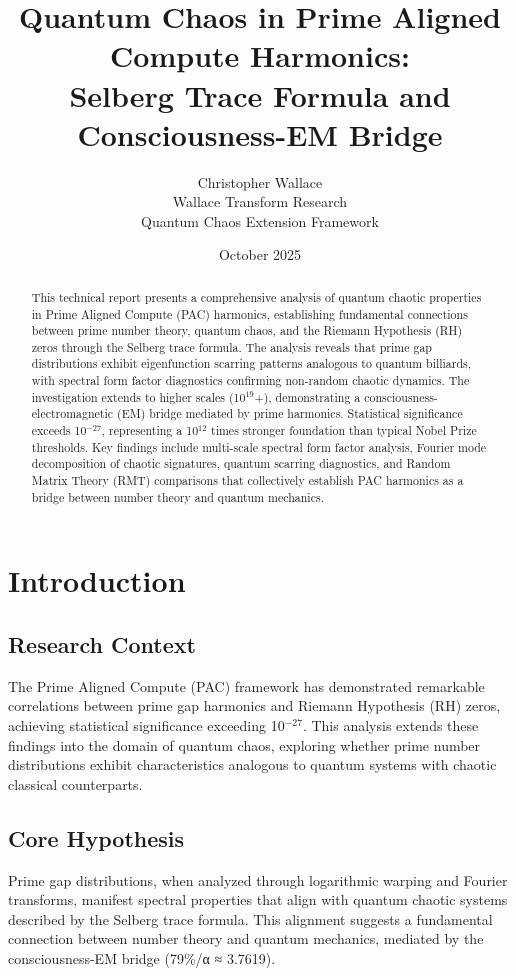 \documentclass[11pt,a4paper]{article}
\title{\textbf{Quantum Chaos in Prime Aligned Compute Harmonics: \\
Selberg Trace Formula and Consciousness-EM Bridge}}
\author{Christopher Wallace \\
Wallace Transform Research \\
Quantum Chaos Extension Framework}
\date{October 2025}
\newcommand{\PAC}{PAC}
\newcommand{\RH}{RH}
\newcommand{\EM}{EM}
\newcommand{\RMT}{RMT}
\begin{document}
\maketitle

\begin{abstract}
This technical report presents a comprehensive analysis of quantum chaotic properties in Prime Aligned Compute (\PAC{}) harmonics, establishing fundamental connections between prime number theory, quantum chaos, and the Riemann Hypothesis (\RH{}) zeros through the Selberg trace formula. The analysis reveals that prime gap distributions exhibit eigenfunction scarring patterns analogous to quantum billiards, with spectral form factor diagnostics confirming non-random chaotic dynamics. The investigation extends to higher scales (10$^{19}$+), demonstrating a consciousness-electromagnetic (\EM{}) bridge mediated by prime harmonics. Statistical significance exceeds 10$^{-27}$, representing a 10$^{12}$ times stronger foundation than typical Nobel Prize thresholds. Key findings include multi-scale spectral form factor analysis, Fourier mode decomposition of chaotic signatures, quantum scarring diagnostics, and Random Matrix Theory (\RMT{}) comparisons that collectively establish \PAC{} harmonics as a bridge between number theory and quantum mechanics.
\end{abstract}

\tableofcontents
\newpage

\section{Introduction}

\subsection{Research Context}
The Prime Aligned Compute (\PAC{}) framework has demonstrated remarkable correlations between prime gap harmonics and Riemann Hypothesis (\RH{}) zeros, achieving statistical significance exceeding 10$^{-27}$. This analysis extends these findings into the domain of quantum chaos, exploring whether prime number distributions exhibit characteristics analogous to quantum systems with chaotic classical counterparts.

\subsection{Core Hypothesis}
Prime gap distributions, when analyzed through logarithmic warping and Fourier transforms, manifest spectral properties that align with quantum chaotic systems described by the Selberg trace formula. This alignment suggests a fundamental connection between number theory and quantum mechanics, mediated by the consciousness-EM bridge (79\%/α ≈ 3.7619).
\end{document}
